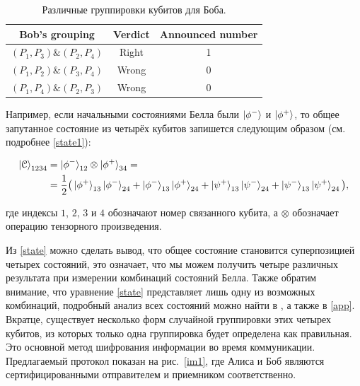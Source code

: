 \documentclass[a4paper,11pt]{article}
\begin{document}
\begin{table}
	\centering
	\caption{\label{tab:2}Различные группировки кубитов для Боба.}
	\begin{tabular}{ |c||c||c| }
		\hline
		Bob's grouping & Verdict & Announced number \\ \hline
		$(P_1, P_3)\&(P_2, P_4)$ & Right & 1 \\
		$(P_1, P_2)\&(P_3, P_4)$ & Wrong & 0 \\
		$(P_1, P_4)\&(P_2, P_3)$ & Wrong & 0 \\
		\hline
	\end{tabular}
	
\end{table}

\fi

Например, если начальными состояниями Белла были $\ket{\phi^-}$ и $\ket{\phi^+}$, то общее запутанное состояние из четырёх кубитов запишется следующим образом (см. подробнее \eqref{state1}):

\begin{align}\label{state}
\ket{\mathcal{C}}_{1234} &= \ket{\phi^-}_{12} \otimes \ket{\phi^+}_{34} = \nonumber \\
&= \dfrac{1}{2} \big(\ket{\phi^+}_{13} \ket{\phi^-}_{24} + 
 					\ket{\phi^-}_{13} \ket{\phi^+}_{24} +
 					\ket{\psi^+}_{13} \ket{\psi^-}_{24} +
 					\ket{\psi^-}_{13} \ket{\psi^+}_{24} \big),
\end{align}

где индексы $1$, $2$, $3$ и $4$ обозначают номер связанного кубита, а $\otimes$ обозначает операцию тензорного произведения.


Из \eqref{state} можно сделать вывод, что общее состояние становится суперпозицией четырех состояний, это означает, что мы можем получить четыре различных результата при измерении комбинаций состояний Белла. Также обратим внимание, что уравнение \eqref{state} представляет лишь одну из возможных комбинаций, подробный анализ всех состояний можно найти в \cite{base,entang}, а также в \ref{app}. Вкратце, существует несколько форм случайной группировки этих четырех кубитов, из которых только одна группировка будет определена как правильная. Это основной метод шифрования информации во время коммуникации. Предлагаемый протокол показан на рис.~\ref{im1}, где Алиса и Боб являются сертифицированными отправителем и приемником соответственно.
\end{document}
